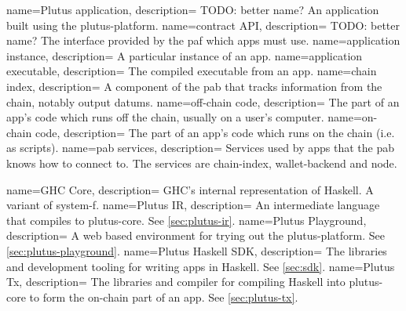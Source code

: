{
  name=Plutus application,
  description={
    TODO: better name?
    An application built using the \gls{plutus-platform}.
  }
}
{
  name=contract API,
  description={
    TODO: better name?
    The interface provided by the \gls{paf} which \glspl{app} must use.
  }
}
{
  name=application instance,
  description={
    A particular instance of an \gls{app}.
  }
}
{
  name=application executable,
  description={
    The compiled executable from an \gls{app}.
  }
}
{
  name=chain index,
  description={
    A component of the \gls{pab} that tracks information from the chain, notably output \glspl{datum}.
  }
}
{
  name=off-chain code,
  description={
    The part of an \gls{app}'s code which runs off the chain, usually on a user's computer.
  }
}
{
  name=on-chain code,
  description={
    The part of an \gls{app}'s code which runs on the chain (i.e. as scripts).
  }
}
{ name={\gls{pab} services},
  description={
    Services used by \glspl{app} that the \gls{pab} knows how to connect to.
    The services are \gls{chain-index}, \gls{wallet-backend} and \gls{node}.
  }
}

{
  name=GHC Core,
  description={
    GHC's internal representation of Haskell.
    A variant of \gls{system-f}.
  }
}
{
  name=Plutus IR,
  description={
    An intermediate language that compiles to \gls{plutus-core}.
    See \cref{sec:plutus-ir}.
  }
}
{
  name=Plutus Playground,
  description={
    A web based environment for trying out the \gls{plutus-platform}.
    See \cref{sec:plutus-playground}.
  }
}
{
  name=Plutus Haskell SDK,
  description={
    The libraries and development tooling for writing \glspl{app} in Haskell.
    See \cref{sec:sdk}.
  }
}
{
  name=Plutus Tx,
  description={
    The libraries and compiler for compiling Haskell into \gls{plutus-core} to form the on-chain part of an \gls{app}.
    See \cref{sec:plutus-tx}.
  }
}
